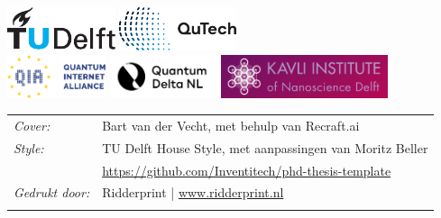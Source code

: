 \begin{titlepage}

\vfill

\begin{center}
\noindent
\includegraphics[height=0.5in]{figures/logos/tudelft.pdf}
\hfill
\includegraphics[height=0.5in]{figures/logos/qutech.pdf}
\hfill
\\ \vspace{2\baselineskip}
\includegraphics[height=0.5in]{figures/logos/qia.pdf}
\hfill
\includegraphics[height=0.5in]{figures/logos/qdnl.png}
\hfill
\includegraphics[height=0.5in]{figures/logos/kavli.pdf}
\end{center}

\vfill

\noindent
\begin{tabular}{@{}p{}@{}p{}}
    \textit{Cover:} & Bart van der Vecht, met behulp van Recraft.ai \\[\medskipamount]
    \textit{Style:} & TU Delft House Style, met aanpassingen van Moritz Beller \\
    & \url{https://github.com/Inventitech/phd-thesis-template} \\[\medskipamount]
    \textit{Gedrukt door:} & Ridderprint | \url{www.ridderprint.nl}\\
    & \\[\medskipamount]
\end{tabular}


\end{titlepage}
